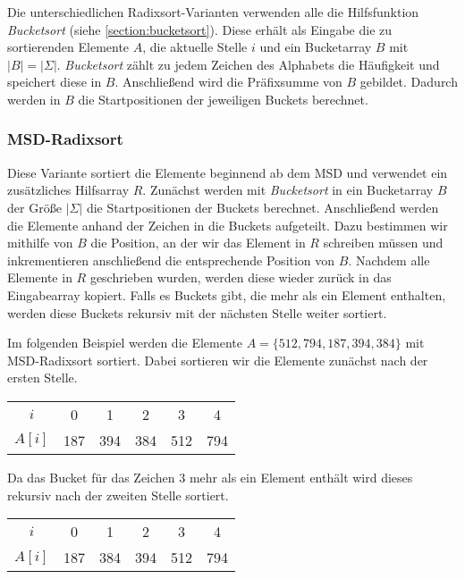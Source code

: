 Die unterschiedlichen Radixsort-Varianten verwenden alle die Hilfsfunktion \emph{Bucketsort} (siehe \cref{section:bucketsort}).
Diese erhält als Eingabe die zu sortierenden Elemente $A$, die aktuelle Stelle $i$ und ein Bucketarray
$B$ mit $|B| = |\Sigma|$. \emph{Bucketsort} zählt zu jedem Zeichen des Alphabets die Häufigkeit
und speichert diese in $B$.
Anschließend wird die Präfixsumme von $B$ gebildet.
Dadurch werden in $B$ die Startpositionen der jeweiligen Buckets berechnet.

\subsubsection{MSD-Radixsort}
\label{sort:radix:msd}

Diese Variante sortiert die Elemente beginnend ab dem MSD und verwendet ein zusätzliches Hilfsarray $R$.
Zunächst werden mit \emph{Bucketsort} in ein Bucketarray $B$ der Größe $|\Sigma|$ die Startpositionen
der Buckets berechnet. Anschließend werden die Elemente anhand der Zeichen in die Buckets aufgeteilt.
Dazu bestimmen wir mithilfe von $B$ die Position, an der wir das Element in $R$ schreiben müssen und
inkrementieren anschließend die entsprechende Position von $B$.
Nachdem alle Elemente in $R$ geschrieben wurden, werden diese wieder zurück in das Eingabearray kopiert.
Falls es Buckets gibt, die mehr als ein Element enthalten, werden diese Buckets rekursiv mit der nächsten
Stelle weiter sortiert.

Im folgenden Beispiel werden die Elemente $A=\{512, 794, 187, 394, 384\}$ mit MSD-Radixsort sortiert.
Dabei sortieren wir die Elemente zunächst nach der ersten Stelle. 

\begin{table}[H]
	\centering
	\begin{tabular}{c|| c | c c | c | c }
		$i$ & 0 & 1 & 2 & 3 & 4 \\
		$A[i]$ & 187 & 394 & 384 & 512 & 794
	\end{tabular}
	\label{tab:radix:msd:step_1}
\end{table}

Da das Bucket für das Zeichen $3$ mehr als ein Element enthält wird dieses rekursiv nach der zweiten Stelle sortiert.

\begin{table}[H]
	\centering
	\begin{tabular}{c|| c | c | c | c | c }
		$i$ & 0 & 1 & 2 & 3 & 4 \\
		$A[i]$ & 187 & 384 & 394 & 512 & 794
	\end{tabular}
	\label{tab:radix:msd:step_2}
\end{table}

